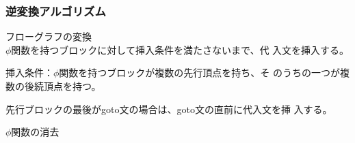 \documentclass[dvipdfmx]{beamer}
\begin{document}
\begin{frame}
  \frametitle{逆変換アルゴリズム}

  \begin{trivlist}
    \item [1.] フローグラフの変換\\
    $\phi$関数を持つブロックに対して挿入条件を満たさないまで、代
    入文を挿入する。

    \vspace*{1zw}

    挿入条件：$\phi$関数を持つブロックが複数の先行頂点を持ち、そ
    のうちの一つが複数の後続頂点を持つ。

    先行ブロックの最後がgoto文の場合は、goto文の直前に代入文を挿
    入する。
    \item [2.] $\phi$関数の消去
  \end{trivlist}

\end{frame}
\end{document}
